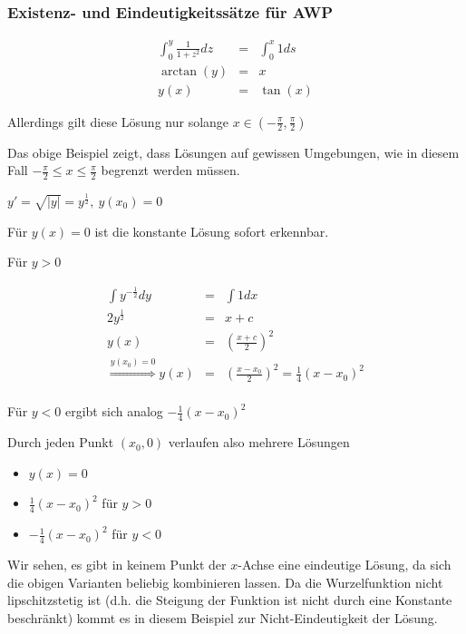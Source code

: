 \documentclass[10pt,a4paper]{article}
\begin{document}
\subsubsection{Existenz- und Eindeutigkeitssätze für AWP}


\begin{bsp}[$y'=1+y^{2}$]

\begin{eqnarray*}
\int_{0}^{y}\frac{1}{1+z^{2}} dz &=& \int_{0}^{x}1 ds \\
\arctan(y)&=&x \\
y(x)&=& \tan(x)
\end{eqnarray*}

Allerdings gilt diese Lösung nur solange $x \in (-\frac{\pi}{2},\frac{\pi}{2})$
\end{bsp}

Das obige Beispiel zeigt, dass Lösungen auf gewissen Umgebungen, wie in diesem Fall $-\frac{\pi}{2}\leq x \leq \frac{\pi}{2}$ begrenzt werden müssen.

\begin{bsp}[$y'=\sqrt{\left| y\right|}$]
$y'=\sqrt{\left| y\right|}=y^{\frac{1}{2}}, ~ y(x_0)=0$ 

Für $y(x)=0$ ist die konstante Lösung sofort erkennbar.

Für $y>0$

\begin{eqnarray*}
\int y^{-\frac{1}{2}} dy &=& \int 1 dx \\
2y^{\frac{1}{2}} &=& x +c \\
y(x) &=& \left( \frac{x+c}{2}\right)^{2} \\
\stackrel{y(x_0)=0}{\Rightarrow} y(x) &=&  \left( \frac{x-x_0}{2}\right)^{2} = \frac{1}{4}(x-x_0)^{2}\\
\end{eqnarray*}

Für $y<0$ ergibt sich analog $-\frac{1}{4}(x-x_0)^{2}$

Durch jeden Punkt $(x_0,0)$ verlaufen also mehrere Lösungen

\begin{itemize}
\item $y(x)=0$
\item $\frac{1}{4}(x-x_0)^{2}$ für $y >0$
\item $ -\frac{1}{4}(x-x_0)^{2}$ für $y<0$
\end{itemize} 

\noindent Wir sehen, es gibt in keinem Punkt der $x$-Achse eine eindeutige Lösung, da sich die obigen Varianten beliebig kombinieren lassen. Da die Wurzelfunktion nicht lipschitzstetig ist (d.h. die Steigung der Funktion ist nicht durch eine Konstante beschränkt) kommt es in diesem Beispiel zur Nicht-Eindeutigkeit der Lösung.

\end{bsp}
\end{document}
